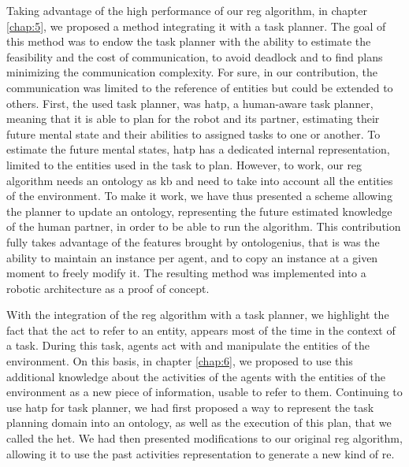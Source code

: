 Taking advantage of the high performance of our \acrshort{reg} algorithm, in chapter \ref{chap:5}, we proposed a method integrating it with a task planner. The goal of this method was to endow the task planner with the ability to estimate the feasibility and the cost of communication, to avoid deadlock and to find plans minimizing the communication complexity. For sure, in our contribution, the communication was limited to the reference of entities but could be extended to others. First, the used task planner, was \acrshort{hatp}, a human-aware task planner, meaning that it is able to plan for the robot and its partner, estimating their future mental state and their abilities to assigned tasks to one or another. To estimate the future mental states, \acrshort{hatp} has a dedicated internal representation, limited to the entities used in the task to plan. However, to work, our \acrshort{reg} algorithm needs an ontology as \acrshort{kb} and need to take into account all the entities of the environment. To make it work, we have thus presented a scheme allowing the planner to update an ontology, representing the future estimated knowledge of the human partner, in order to be able to run the algorithm. This contribution fully takes advantage of the features brought by ontologenius, that is was the ability to maintain an instance per agent, and to copy an instance at a given moment to freely modify it. The resulting method was implemented into a robotic architecture as a proof of concept.

With the integration of the \acrshort{reg} algorithm with a task planner, we highlight the fact that the act to refer to an entity, appears most of the time in the context of a task. During this task, agents act with and manipulate the entities of the environment. On this basis, in chapter \ref{chap:6}, we proposed to use this additional knowledge about the activities of the agents with the entities of the environment as a new piece of information, usable to refer to them. Continuing to use \acrshort{hatp} for task planner, we had first proposed a way to represent the task planning domain into an ontology, as well as the execution of this plan, that we called the \acrfull{het}. We had then presented modifications to our original \acrshort{reg} algorithm, allowing it to use the past activities representation to generate a new kind of \acrfull{re}.


